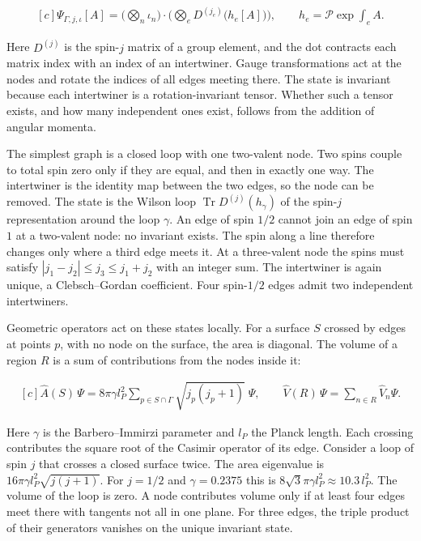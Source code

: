 \documentclass[11pt,oneside]{book}
\newenvironment{centeredalign}{\[\begin{gathered}[c]}{\end{gathered}\]}
\begin{document}
\begin{centeredalign}
\Psi_{\Gamma,j,\iota}[A]=\Big(\bigotimes_n\iota_n\Big)\cdot\Big(\bigotimes_e D^{(j_e)}\big(h_e[A]\big)\Big),\qquad
h_e=\mathcal P\exp\int_eA.
\end{centeredalign}

Here \(D^{(j)}\) is the spin-\(j\) matrix of a group element, and the dot contracts each matrix index with an index of an intertwiner. Gauge transformations act at the nodes and rotate the indices of all edges meeting there. The state is invariant because each intertwiner is a rotation-invariant tensor. Whether such a tensor exists, and how many independent ones exist, follows from the addition of angular momenta.

The simplest graph is a closed loop with one two-valent node. Two spins couple to total spin zero only if they are equal, and then in exactly one way. The intertwiner is the identity map between the two edges, so the node can be removed. The state is the Wilson loop \(\operatorname{Tr}D^{(j)}(h_\gamma)\) of the spin-\(j\) representation around the loop \(\gamma\). An edge of spin \(1/2\) cannot join an edge of spin \(1\) at a two-valent node: no invariant exists. The spin along a line therefore changes only where a third edge meets it. At a three-valent node the spins must satisfy \(|j_1-j_2|\leq j_3\leq j_1+j_2\) with an integer sum. The intertwiner is again unique, a Clebsch--Gordan coefficient. Four spin-\(1/2\) edges admit two independent intertwiners.

Geometric operators act on these states locally. For a surface \(S\) crossed by edges at points \(p\), with no node on the surface, the area is diagonal. The volume of a region \(R\) is a sum of contributions from the nodes inside it:

\begin{centeredalign}
\hat A(S)\,\Psi=8\pi\gamma l_P^2\sum_{p\in S\cap\Gamma}\sqrt{j_p(j_p+1)}\;\Psi,\qquad
\hat V(R)\,\Psi=\sum_{n\in R}\hat V_n\Psi.
\end{centeredalign}

Here \(\gamma\) is the Barbero--Immirzi parameter and \(l_P\) the Planck length. Each crossing contributes the square root of the Casimir operator of its edge. Consider a loop of spin \(j\) that crosses a closed surface twice. The area eigenvalue is \(16\pi\gamma l_P^2\sqrt{j(j+1)}\). For \(j=1/2\) and \(\gamma=0.2375\) this is \(8\sqrt3\pi\gamma l_P^2\approx10.3\,l_P^2\). The volume of the loop is zero. A node contributes volume only if at least four edges meet there with tangents not all in one plane. For three edges, the triple product of their generators vanishes on the unique invariant state.
\end{document}

